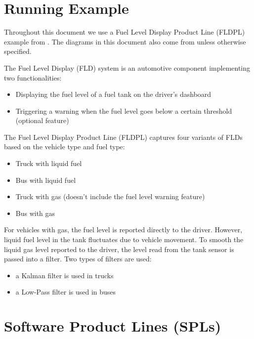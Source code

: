 \documentclass[11pt]{article}
\begin{document}
\section{Running Example}

Throughout this document we use a Fuel Level Display Product Line (FLDPL) example from \cite{Gallucci_2013}. The diagrams in this document also come from \cite{Gallucci_2013} unless otherwise specified.

The Fuel Level Display (FLD) system is an automotive component implementing two functionalities:

\begin{itemize}
\item Displaying the fuel level of a fuel tank on the driver's dashboard
\item Triggering a warning when the fuel level goes below a certain threshold (optional feature)
\end{itemize}

The Fuel Level Display Product Line (FLDPL) captures four variants of FLDs based on the vehicle type and fuel type:

\begin{itemize}
\item Truck with liquid fuel
\item Bus with liquid fuel
\item Truck with gas (doesn't include the fuel level warning feature)
\item Bus with gas
\end{itemize}

For vehicles with gas, the fuel level is reported directly to the driver. However, liquid fuel level in the tank fluctuates due to vehicle movement. To smooth the liquid gas level reported to the driver, the level read from the tank sensor is passed into a filter. Two types of filters are used:

\begin{itemize}
\item a Kalman filter is used in trucks
\item a Low-Pass filter is used in buses
\end{itemize}

\section{Software Product Lines (SPLs)}

\end{document}
